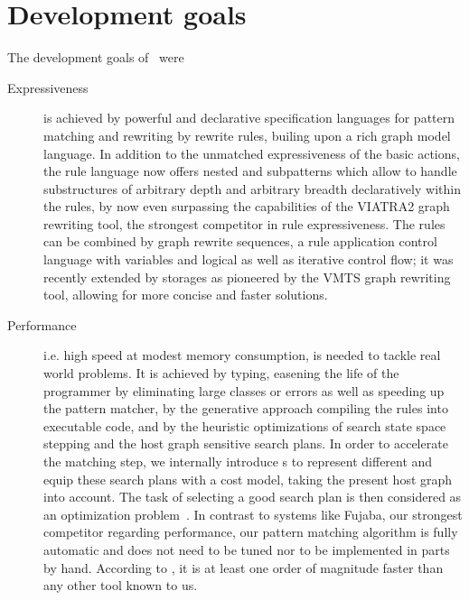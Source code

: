 \section{Development goals}

The development goals of \GrG\ were

\begin{description}

\item[Expressiveness]
is achieved by powerful and declarative specification languages for pattern matching and rewriting by rewrite rules, builing upon a rich graph model language.
In addition to the unmatched expressiveness of the basic actions,
the rule language now offers nested and subpatterns which allow to handle substructures of arbitrary depth and arbitrary breadth declaratively within the rules,
by now even surpassing the capabilities of the VIATRA2\cite{viatra2,recursiveviatra} graph rewriting tool, the strongest competitor in rule expressiveness. 
The rules can be combined by graph rewrite sequences, a rule application control language with variables and logical as well as iterative control flow;
it was recently extended by storages as pioneered by the VMTS\cite{vmts} graph rewriting tool, allowing for more concise and faster solutions.

\item[Performance]
i.e. high speed at modest memory consumption, is needed to tackle real world problems.
It is achieved by typing, easening the life of the programmer by eliminating large classes or errors as well as speeding up the pattern matcher,
by the generative approach compiling the rules into executable code, 
and by the heuristic optimizations of search state space stepping and the host graph sensitive search plans.
In order to accelerate the matching step, we internally introduce s 
to represent different  and equip these search plans with a cost model, taking the present host graph into account.
The task of selecting a good search plan is then considered as an optimization problem~\cite{BKG:07,Bat:06}.
In contrast to systems like Fujaba\cite{fujaba,fuj}, our strongest competitor regarding performance, 
our pattern matching algorithm is fully automatic and does not need to be tuned nor to be implemented in parts by hand.
According to \cite{varro_bench}, it is at least one order of magnitude faster than any other tool known to us.


\end{description}
